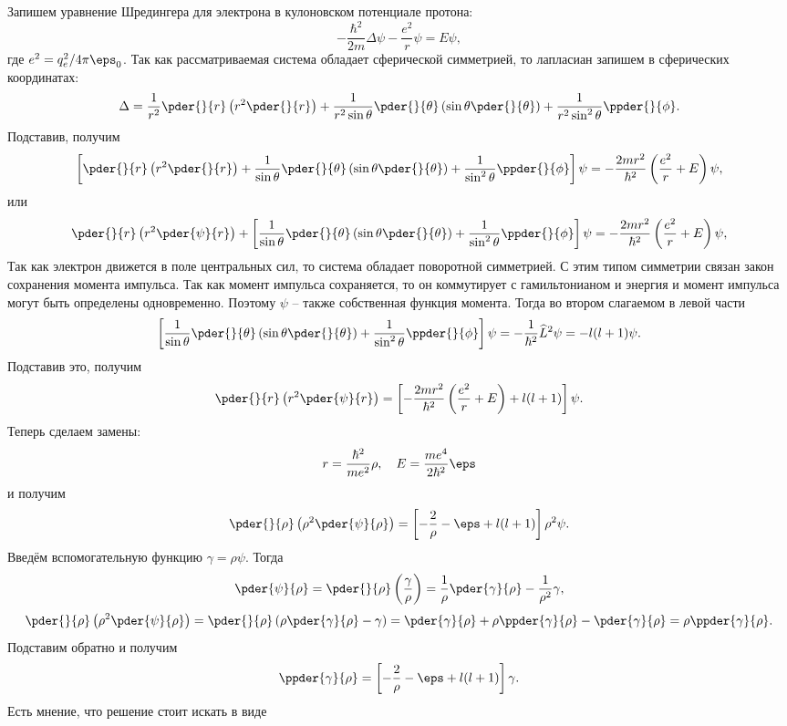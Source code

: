 Запишем уравнение Шредингера для электрона в кулоновском потенциале протона:
\[
    -\frac{\hbar^2}{2m}\Delta\psi - \frac{e^2}{r}\psi = E\psi,
\]
где \( e^2 = q_e^2/4\pi\eps_0 \). Так как рассматриваемая система обладает
сферической симметрией, то лапласиан запишем в сферических координатах:
\[
    \Delta = \frac{1}{r^2}\pder{}{r}\left(r^2\pder{}{r}\right) +
    \frac{1}{r^2\sin\theta}\pder{}{\theta}\left(\sin\theta\pder{}{\theta}\right) +
    \frac{1}{r^2\sin^2\theta}\ppder{}{\phi}.
\]
Подставив, получим
\[
    \left[\pder{}{r}\left(r^2\pder{}{r}\right) +
    \frac{1}{\sin\theta}\pder{}{\theta}\left(\sin\theta\pder{}{\theta}\right) +
    \frac{1}{\sin^2\theta}\ppder{}{\phi}\right]\psi =
    -\frac{2mr^2}{\hbar^2}\left(\frac{e^2}{r}+E\right)\psi,
\]
или
\[
    \pder{}{r}\left(r^2\pder{\psi}{r}\right) +
    \left[
    \frac{1}{\sin\theta}\pder{}{\theta}\left(\sin\theta\pder{}{\theta}\right) +
    \frac{1}{\sin^2\theta}\ppder{}{\phi}\right]\psi =
    -\frac{2mr^2}{\hbar^2}\left(\frac{e^2}{r}+E\right)\psi,
\]
Так как электрон движется в поле центральных сил, то система обладает
поворотной симметрией. С этим типом симметрии связан закон сохранения момента
импульса. Так как момент импульса сохраняется, то он коммутирует
с гамильтонианом и энергия и момент импульса могут быть определены
одновременно. Поэтому \( \psi \) -- также собственная функция момента.
Тогда во втором слагаемом в левой части
\[
    \left[
    \frac{1}{\sin\theta}\pder{}{\theta}\left(\sin\theta\pder{}{\theta}\right) +
    \frac{1}{\sin^2\theta}\ppder{}{\phi}\right]\psi =
    -\frac{1}{\hbar^2}\hat{L}^2\psi = -l(l+1)\psi.
\]
Подставив это, получим
\[
    \pder{}{r}\left(r^2\pder{\psi}{r}\right) =
    \left[-\frac{2mr^2}{\hbar^2}\left(\frac{e^2}{r}+E\right)+l(l+1)\right]\psi.
\]
Теперь сделаем замены:
\[
    r = \frac{\hbar^2}{me^2}\rho,\quad E = \frac{me^4}{2\hbar^2}\eps
\]
и получим
\[
    \pder{}{\rho}\left(\rho^2\pder{\psi}{\rho}\right) =
    \left[-\frac{2}{\rho}-\eps+l(l+1)\right]\rho^2\psi.
\]
Введём вспомогательную функцию \( \gamma = \rho\psi \). Тогда
\[
    \pder{\psi}{\rho} = \pder{}{\rho}\left(\frac{\gamma}{\rho}\right) =
    \frac{1}{\rho}\pder{\gamma}{\rho} - \frac{1}{\rho^2}\gamma,
\]
\[
    \pder{}{\rho}\left(\rho^2\pder{\psi}{\rho}\right) = \pder{}{\rho}\left(
    \rho\pder{\gamma}{\rho} - \gamma\right) = \pder{\gamma}{\rho} + \rho\ppder{\gamma}{\rho} -
    \pder{\gamma}{\rho} = \rho\ppder{\gamma}{\rho}.
\]
Подставим обратно и получим
\[
    \ppder{\gamma}{\rho} =
    \left[-\frac{2}{\rho}-\eps+l(l+1)\right]\gamma.
\]
Есть мнение, что решение стоит искать в виде
